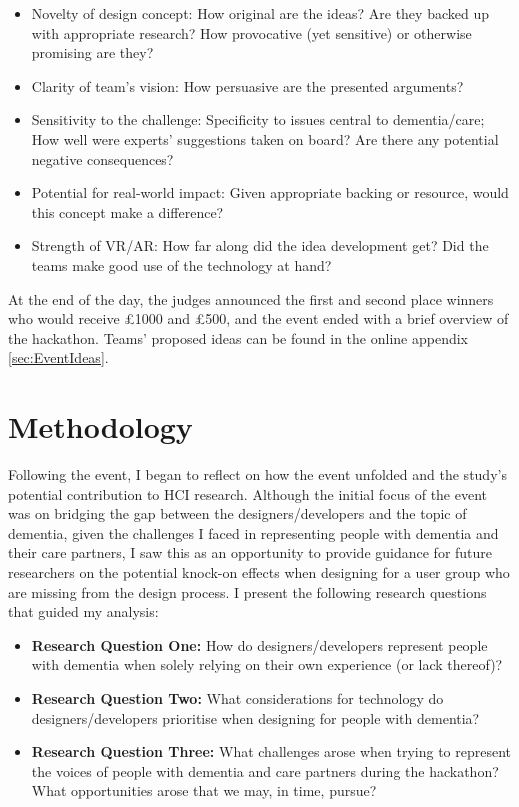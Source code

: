 \begin{itemize}
\item Novelty of design concept: How original are the ideas? Are they backed up with appropriate research? How provocative (yet sensitive) or otherwise promising are they?
\item Clarity of team's vision: How persuasive are the presented arguments?
\item Sensitivity to the challenge: Specificity to issues central to dementia/care; How well were experts’ suggestions taken on board? Are there any potential negative consequences?
\item Potential for real-world impact: Given appropriate backing or resource, would this concept make a difference?
\item Strength of VR/AR: How far along did the idea development get? Did the teams make good use of the technology at hand? 
\end{itemize}

At the end of the day, the judges announced the first and second place winners who would receive £1000 and £500, and the event ended with a brief overview of the hackathon. Teams' proposed ideas can be found in the online appendix \ref{sec:EventIdeas}.

\section{Methodology}
\label{sec:methodology}
Following the event, I began to reflect on how the event unfolded and the study's potential contribution to HCI research. Although the initial focus of the event was on bridging the gap between the designers/developers and the topic of dementia, given the challenges I faced in representing people with dementia and their care partners, I saw this as an opportunity to provide guidance for future researchers on the potential knock-on effects when designing for a user group who are missing from the design process. I present the following research questions that guided my analysis:

\begin{itemize}
    \item \textbf{Research Question One:} How do designers/developers represent people with dementia when solely relying on their own experience (or lack thereof)? 

    \item \textbf{Research Question Two:} What considerations for technology do designers/developers prioritise when designing for people with dementia?

    \item \textbf{Research Question Three:}  What challenges arose when trying to represent the voices of people with dementia and care partners during the hackathon? What opportunities arose that we may, in time, pursue?

\end{itemize}


